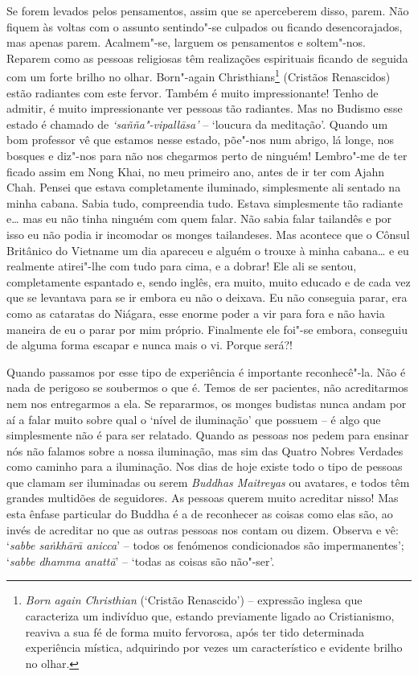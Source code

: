 Se forem levados pelos pensamentos, assim que se aperceberem disso,
parem. Não fiquem às voltas com o assunto sentindo"-se culpados ou
ficando desencorajados, mas apenas parem. Acalmem"-se, larguem os
pensamentos e soltem"-nos. Reparem como as pessoas religiosas têm
realizações espirituais ficando de seguida com um forte brilho no olhar.
Born"-again Christhians\footnote{%
  \emph{Born again Christhian} (`Cristão Renascido') -- expressão
  inglesa que caracteriza um indivíduo que, estando previamente ligado ao
  Cristianismo, reaviva a sua fé de forma muito fervorosa, após ter tido
  determinada experiência mística, adquirindo por vezes um característico
  e evidente brilho no olhar.}
(Cristãos Renascidos) estão radiantes com este
fervor. Também é muito impressionante! Tenho de admitir, é muito
impressionante ver pessoas tão radiantes. Mas no Budismo esse estado é
chamado de \emph{`sañña"-vipallāsa'} -- `loucura da meditação'. Quando um
bom professor vê que estamos nesse estado, põe"-nos num abrigo, lá longe,
nos bosques e diz"-nos para não nos chegarmos perto de ninguém! Lembro"-me
de ter ficado assim em Nong Khai, no meu primeiro ano, antes de ir ter
com Ajahn Chah. Pensei que estava completamente iluminado, simplesmente
ali sentado na minha cabana. Sabia tudo, compreendia tudo. Estava
simplesmente tão radiante e\ldots{} mas eu não tinha ninguém com quem
falar. Não sabia falar tailandês e por isso eu não podia ir incomodar os
monges tailandeses. Mas acontece que o Cônsul Britânico do Vietname um
dia apareceu e alguém o trouxe à minha cabana\ldots{} e eu realmente
atirei"-lhe com tudo para cima, e a dobrar! Ele ali se sentou,
completamente espantado e, sendo inglês, era muito, muito educado e de
cada vez que se levantava para se ir embora eu não o deixava. Eu não
conseguia parar, era como as cataratas do Niágara, esse enorme poder a
vir para fora e não havia maneira de eu o parar por mim próprio.
Finalmente ele foi"-se embora, conseguiu de alguma forma escapar e nunca
mais o vi. Porque será?!

Quando passamos por esse tipo de experiência é importante reconhecê"-la.
Não é nada de perigoso se soubermos o que é. Temos de ser pacientes, não
acreditarmos nem nos entregarmos a ela. Se repararmos, os monges
budistas nunca andam por aí a falar muito sobre qual o `nível de
iluminação' que possuem -- é
algo que simplesmente não é para ser relatado. Quando as pessoas nos
pedem para ensinar nós não falamos sobre a nossa iluminação, mas sim das
Quatro Nobres Verdades como caminho para a iluminação. Nos dias de hoje
existe todo o tipo de pessoas que clamam ser iluminadas ou serem
\emph{Buddhas Maitreyas} ou avatares, e todos têm grandes multidões de
seguidores. As pessoas querem muito acreditar nisso! Mas esta ênfase
particular do Buddha é a de reconhecer as coisas como elas são, ao invés
de acreditar no que as outras pessoas nos contam ou dizem. Observa e vê:
`\emph{sabbe saṅkhārā anicca}' -- todos os fenómenos condicionados são
impermanentes'; `\emph{sabbe dhamma anattā}' -- `todas as coisas são
não"-ser'.

